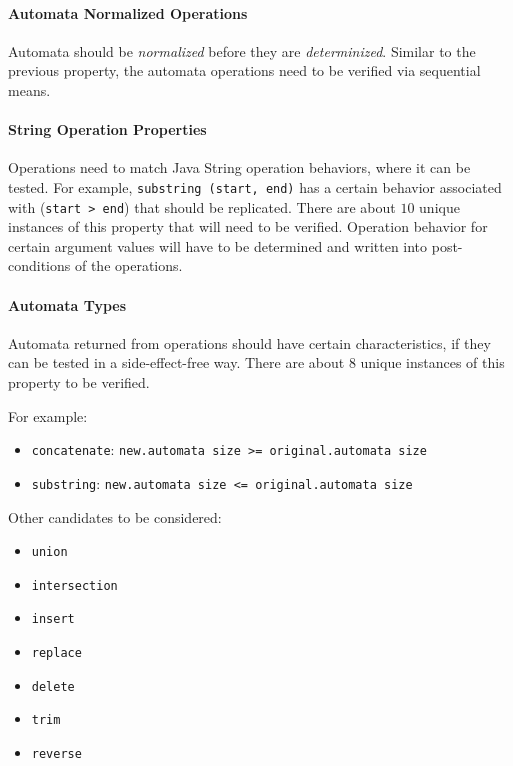 \documentclass[letterpaper,11pt,twocolumn]{article}
\begin{document}
\paragraph{Automata Normalized Operations} Automata should be
\textit{normalized} before they are \textit{determinized}.  Similar to the
previous property, the automata operations need to be verified via sequential
means.

\paragraph{String Operation Properties} Operations need to match Java String
operation behaviors, where it can be tested.  For example,
\texttt{substring~(start, end)} has a certain behavior associated with
(\texttt{start > end}) that should be replicated. There are about \(10\) unique
instances of this property that will need to be verified.  Operation behavior
for certain argument values will have to be determined and written into
post-conditions of the operations.

\paragraph{Automata Types} Automata returned from operations should have certain
characteristics, if they can be tested in a side-effect-free way.  There are
about \(8\) unique instances of this property to be verified.

For example:

\begin{itemize}
\item{\texttt{concatenate}: \texttt{new.automata size >= original.automata
      size}}
\item{\texttt{substring}: \texttt{new.automata size <= original.automata size}}
\end{itemize}

Other candidates to be considered:

\begin{itemize}
\item{\texttt{union}}
\item{\texttt{intersection}}
\item{\texttt{insert}}
\item{\texttt{replace}}
\item{\texttt{delete}}
\item{\texttt{trim}}
\item{\texttt{reverse}}
\end{itemize}
\end{document}
